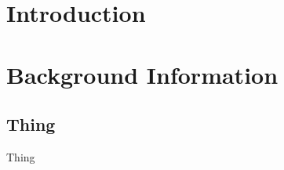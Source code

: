 \documentclass[12pt]{report}
\begin{document}
	\tableofcontents
	\listoffigures
	\listoftables
	
	
	\chapter{Introduction}
	\label{ch:introduction}
	
	
	\chapter{Background Information}
	\label{ch:background_information}
	
	
	
	\clearpage
	\renewcommand{\bibname}{References}
	\printbibliography
	
	
	\begin{appendices}
		\chapter{Thing}
		\label{app:appendix}
		Thing
		
	\end{appendices}
	
\end{document}
